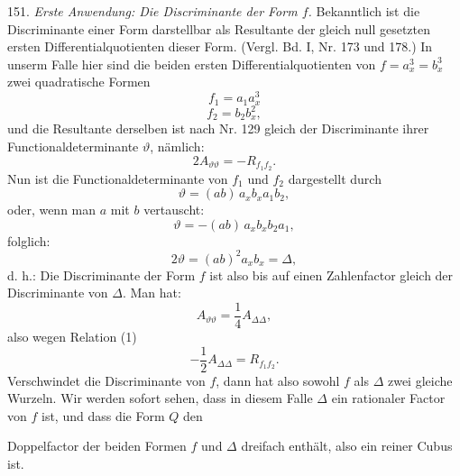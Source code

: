 \documentclass[11pt]{article}
\providecommand{\weberpage}[1]{}
\providecommand{\weq}[2]{\begin{equation}\tag{#1}#2\end{equation}}
\let\Delta\varDelta
\begin{document}
151. \textit{Erste Anwendung: Die Discriminante der Form $f$.} Bekanntlich ist die Discriminante einer Form darstellbar als Resultante der gleich null gesetzten ersten Differentialquotienten dieser Form. (Vergl. Bd. I, Nr. 173 und 178.) In unserm Falle hier sind die beiden ersten Differentialquotienten von $f = a_x^3 = b_x^3$ zwei quadratische Formen
\[
f_1 = a_1 a_x^3
\]
\[
f_2 = b_2 b_x^2,
\]
und die Resultante derselben ist nach Nr. 129 gleich der Discriminante ihrer Functionaldeterminante $\vartheta$, nämlich:
\weq{1}{2A_{\vartheta\vartheta} = -R_{f_1f_2}.}
Nun ist die Functionaldeterminante von $f_1$ und $f_2$ dargestellt durch
\[
\vartheta = (ab)\,a_x b_x a_1 b_2,
\]
oder, wenn man $a$ mit $b$ vertauscht:
\[
\vartheta = -(ab)\,a_x b_x b_2 a_1,
\]
folglich:
\[
2\vartheta = (ab)^2 a_x b_x = \Delta,
\]
d. h.: \glqq Die Discriminante der Form $f$ ist also bis auf einen Zahlenfactor gleich der Discriminante von $\Delta$.\grqq{}
Man hat:
\[
A_{\vartheta\vartheta} = \frac{1}{4}A_{\Delta\Delta},
\]
also wegen Relation (1)
\[
-\frac{1}{2}A_{\Delta\Delta} = R_{f_1f_2}.
\]
Verschwindet die Discriminante von $f$, dann hat also sowohl $f$ als $\Delta$ zwei gleiche Wurzeln. Wir werden sofort sehen, dass in diesem Falle $\Delta$ ein rationaler Factor von $f$ ist, und dass die Form $Q$ den


\weberpage{175}
Doppelfactor der beiden Formen $f$ und $\Delta$ dreifach enthält, also ein reiner Cubus ist.
\end{document}
